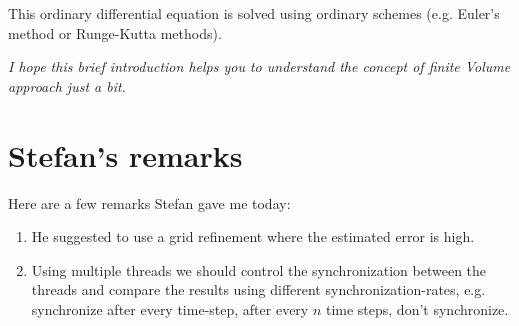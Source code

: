 \documentclass[12pt,a4paper]{article}
\newcommand{\ita}[1]{\textit{#1}}
\begin{document}
This ordinary differential equation is solved using ordinary schemes (e.g. Euler's method or Runge-Kutta methods).

\ita{I hope this brief introduction helps you to understand the concept of finite Volume approach just a bit.}

\section{Stefan's remarks}
Here are a few remarks Stefan gave me today:
\begin{enumerate}
\item He suggested to use a grid refinement where the estimated error is high.
\item Using multiple threads we should control the synchronization between the threads and compare the results using different synchronization-rates, e.g. synchronize after every time-step, after every $n$ time steps, don't synchronize.
\end{enumerate}
\end{document}

